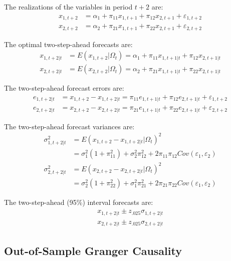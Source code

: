 \documentclass[
  12pt,
  oneside]{book}
\begin{document}
The realizations of the variables in period \(t+2\) are:
\[\begin{aligned}
x_{1,t+2} &= \alpha_1 + \pi_{11} x_{1,t+1} + \pi_{12} x_{2,t+1} + \varepsilon_{1,t+2} \\
x_{2,t+2} &= \alpha_2 + \pi_{21} x_{1,t+1} + \pi_{22} x_{2,t+1} + \varepsilon_{2,t+2}
\end{aligned}\]

The optimal two-step-ahead forecasts are:
\[\begin{aligned}
x_{1,t+2|t} &= E(x_{1,t+2}|\Omega_t) = \alpha_1 + \pi_{11} x_{1,t+1|t} + \pi_{12} x_{2,t+1|t} \\
x_{2,t+2|t} &= E(x_{2,t+2}|\Omega_t) = \alpha_2 + \pi_{21} x_{1,t+1|t} + \pi_{22} x_{2,t+1|t}
\end{aligned}\]

The two-step-ahead forecast errors are:
\[\begin{aligned}
e_{1,t+2|t} &= x_{1,t+2} - x_{1,t+2|t} = \pi_{11} e_{1,t+1|t} + \pi_{12} e_{2,t+1|t} + \varepsilon_{1,t+2} \\
e_{2,t+2|t} &= x_{2,t+2} - x_{2,t+2|t} = \pi_{21} e_{1,t+1|t} + \pi_{22} e_{2,t+1|t} + \varepsilon_{2,t+2}
\end{aligned}\]

The two-step-ahead forecast variances are:
\[\begin{aligned}
\sigma_{1,t+2|t}^2 &= E(x_{1,t+2} - x_{1,t+2|t}|\Omega_t)^2 \\ 
&= \sigma_{1}^2(1+\pi_{11}^2) + \sigma_{2}^2\pi_{12}^2 + 2\pi_{11}\pi_{12} Cov(\varepsilon_{1},\varepsilon_{2})\\
\sigma_{2,t+2|t}^2 &= E(x_{2,t+2} - x_{2,t+2|t}|\Omega_t)^2 \\ 
&= \sigma_{2}^2(1+\pi_{22}^2) + \sigma_{1}^2\pi_{21}^2 + 2\pi_{21}\pi_{22} Cov(\varepsilon_{1},\varepsilon_{2})
\end{aligned}\]

The two-step-ahead (95\%) interval forecasts are:
\[\begin{aligned}
x_{1,t+2|t} \pm z_{.025}\sigma_{1,t+2|t} \\
x_{2,t+2|t} \pm z_{.025}\sigma_{2,t+2|t}
\end{aligned}\]

\hypertarget{out-of-sample-granger-causality}{%
\subsection{Out-of-Sample Granger Causality}\label{out-of-sample-granger-causality}}
\end{document}
